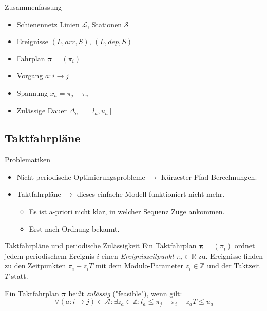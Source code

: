 \documentclass[accentcolor = tud11b, colorbacktitle, landscape, german, presentation, tudmathserif]{tudbeamer}
\newcommand{\arr}{\mathit{arr}}
\newcommand{\dep}{\mathit{dep}}
\newcommand{\R}{\ensuremath{\mathbb{R}}}
\newcommand{\Z}{\ensuremath{\mathbb{Z}}}
\renewcommand{\vec}[1]{\boldsymbol{\mathbf{#1}}}
\begin{document}
			\begin{frame}{Zusammenfassung}
				\begin{itemize}
					\item Schienennetz    \tabto{3cm} Linien \( \mathcal{L} \), Stationen \( \mathcal{S} \)
					\item Ereignisse      \tabto{3cm} \( (L, \arr, S) \), \( (L, \dep, S) \)
					\item Fahrplan        \tabto{3cm} \( \vec{\pi} = (\pi_i) \)
					\item Vorgang         \tabto{3cm} \( a : i \to j \)
					\item Spannung        \tabto{3cm} \( x_a = \pi_j - \pi_i \)
					\item Zulässige Dauer \tabto{3cm} \( \Delta_a = [l_a, u_a] \)
				\end{itemize}
			\end{frame}
		
		\subsection{Taktfahrpläne}
			\begin{frame}{Problematiken}
				\begin{itemize}
					\item Nicht-periodische Optimierungsprobleme \(\to\) Kürzester-Pfad-Berechnungen.
					\item Taktfahrpläne \(\to\) dieses einfache Modell funktioniert nicht mehr.
						\begin{itemize}
							\item Es ist a-priori nicht klar, in welcher Sequenz Züge ankommen.
							\item Erst nach Ordnung bekannt.
						\end{itemize}
				\end{itemize}
			\end{frame}
		
			\begin{frame}{Taktfahrpläne und periodische Zulässigkeit}
				Ein Taktfahrplan \( \vec{\pi} = (\pi_i) \) ordnet jedem periodischem Ereignis \( i \) einen \emph{Ereigniszeitpunkt} \( \pi_i \in \R \) zu. Ereignisse finden zu den Zeitpunkten \( \pi_i + z_i T \) mit dem Modulo-Parameter \(z_i \in \Z\) und der Taktzeit \(T\) statt.
			
				\vspace{1cm}
				Ein Taktfahrplan \( \vec{\pi} \) heißt \emph{zulässig} ("feasible"), wenn gilt:
				\begin{equation*}
					\forall (a : i \to j) \in \mathcal{A} : \exists z_a \in \Z : l_a \leq \pi_j - \pi_i - z_a T \leq u_a
				\end{equation*}
			\end{frame}
		
\end{document}
